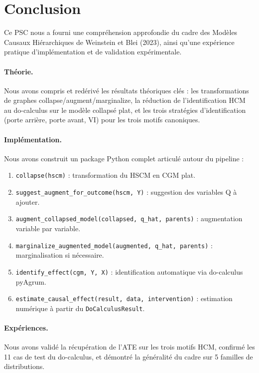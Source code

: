 \documentclass[11pt,a4paper]{article}
\begin{document}
\section{Conclusion}
\label{sec:conclusion}

Ce PSC nous a fourni une compréhension approfondie du cadre des Modèles Causaux Hiérarchiques de Weinstein et Blei (2023), ainsi qu'une expérience pratique d'implémentation et de validation expérimentale.

\paragraph{Théorie.}
Nous avons compris et redérivé les résultats théoriques clés : les transformations de graphes collapse/augment/marginalize, la réduction de l'identification HCM au do-calculus sur le modèle collapsé plat, et les trois stratégies d'identification (porte arrière, porte avant, VI) pour les trois motifs canoniques.

\paragraph{Implémentation.}
Nous avons construit un package Python complet articulé autour du pipeline :
\begin{enumerate}
  \item \texttt{collapse(hscm)} : transformation du HSCM en CGM plat.
  \item \texttt{suggest\_augment\_for\_outcome(hscm, Y)} : suggestion des variables Q à ajouter.
  \item \texttt{augment\_collapsed\_model(collapsed, q\_hat, parents)} : augmentation variable par variable.
  \item \texttt{marginalize\_augmented\_model(augmented, q\_hat, parents)} : marginalisation si nécessaire.
  \item \texttt{identify\_effect(cgm, Y, X)} : identification automatique via do-calculus pyAgrum.
  \item \texttt{estimate\_causal\_effect(result, data, intervention)} : estimation numérique à partir du \texttt{DoCalculusResult}.
\end{enumerate}

\paragraph{Expériences.}
Nous avons validé la récupération de l'ATE sur les trois motifs HCM, confirmé les 11 cas de test du do-calculus, et démontré la généralité du cadre sur 5 familles de distributions.
\end{document}
